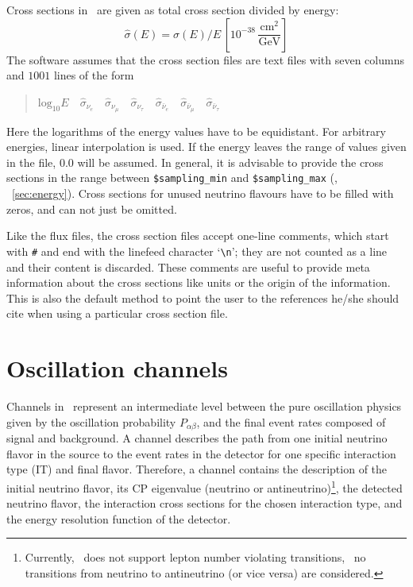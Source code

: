 Cross sections in \GLOBES\ are given as total cross section divided by energy:
\begin{equation}
\hat\sigma(E)=\sigma(E)/E\,\left[ 10^{-38}\,
\frac{\mathrm{cm}^2}{\mathrm{GeV}} \right]
\end{equation}
The software assumes that the cross section files are text files with 
seven columns and $1001$ lines of the form
\begin{quotation}
$\mathrm{log}_{10} E\quad
\hat\sigma_{\nu_e}\quad
\hat\sigma_{\nu_\mu}\quad
\hat\sigma_{\nu_\tau}\quad
\hat\sigma_{\bar\nu_e}\quad
\hat\sigma_{\bar\nu_\mu}\quad
\hat\sigma_{\bar\nu_\tau}$
\end{quotation}
Here the logarithms of the energy values have to be equidistant. For 
arbitrary energies, linear interpolation is used. If the energy leaves the
range of values given in the file, $0.0$ will be assumed. In general, it is advisable to provide the cross sections in the range between {\tt \$sampling\_min} and {\tt \$sampling\_max} (\cf, \Sec~\ref{sec:energy}).
Cross sections for unused neutrino flavours have to be filled with zeros, and
can not just be omitted.

Like the flux files, the cross section files 
accept one-line comments, which start
with {\tt \#} and end with the linefeed character `\verb+\n+'; they are
not counted as a line and their content is discarded. These comments
are useful to provide meta information about the cross sections like units
or the origin of the information. This is also the default method
to point the user to the references he/she should cite when using
a particular cross section file.

\section{Oscillation channels}
\label{sec:channel}

Channels in \GLOBES\ represent an intermediate level 
between the pure oscillation physics given by the oscillation probability
$P_{\alpha\beta}$, and the final event rates composed of signal and 
background. A channel describes the path from one
initial neutrino flavor in the source to the event rates in the detector for one specific interaction type (IT) and final flavor.  
Therefore, a channel contains the description of the 
initial neutrino flavor, its CP eigenvalue 
(neutrino or antineutrino)\footnote{Currently, \GLOBES\ does not support lepton
number violating transitions, \ie\ no transitions from neutrino to 
antineutrino (or vice versa) are considered.}, 
the detected neutrino flavor, the interaction cross sections for the chosen interaction type, and the energy resolution function of the detector.

